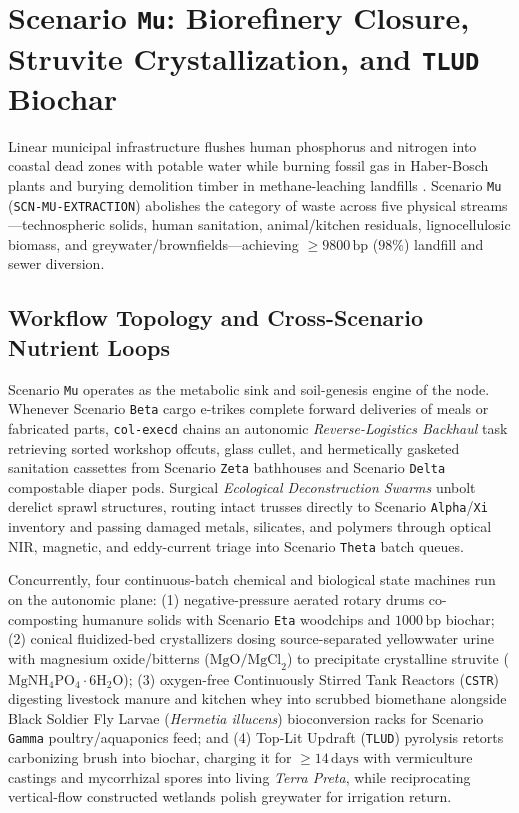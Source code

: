 \section{Scenario \texttt{Mu}: Biorefinery Closure, Struvite Crystallization, and \texttt{TLUD} Biochar}
\label{sec:scn-mu}

Linear municipal infrastructure flushes human phosphorus and nitrogen into coastal dead zones with potable water while burning fossil gas in
Haber-Bosch plants and burying demolition timber in methane-leaching landfills \parencite{rockstrom2009safe,kadlec1996}. Scenario \texttt{Mu}
(\texttt{SCN-MU-EXTRACTION}) abolishes the category of waste across five physical streams---technospheric solids, human sanitation,
animal/kitchen residuals, lignocellulosic biomass, and greywater/brownfields---achieving $\ge 9800\,\mathrm{bp}$ ($98\%$) landfill and sewer
diversion.

\subsection{Workflow Topology and Cross-Scenario Nutrient Loops}

Scenario \texttt{Mu} operates as the metabolic sink and soil-genesis engine of the node. Whenever Scenario \texttt{Beta} cargo e-trikes complete
forward deliveries of meals or fabricated parts, \texttt{col-execd} chains an autonomic \emph{Reverse-Logistics Backhaul} task retrieving sorted
workshop offcuts, glass cullet, and hermetically gasketed sanitation cassettes from Scenario \texttt{Zeta} bathhouses and Scenario \texttt{Delta}
compostable diaper pods. Surgical \emph{Ecological Deconstruction Swarms} unbolt derelict sprawl structures, routing intact trusses directly to
Scenario \texttt{Alpha}/\texttt{Xi} inventory and passing damaged metals, silicates, and polymers through optical NIR, magnetic, and eddy-current
triage into Scenario \texttt{Theta} batch queues.

Concurrently, four continuous-batch chemical and biological state machines run on the autonomic plane: (1) negative-pressure aerated rotary drums
co-composting humanure solids with Scenario \texttt{Eta} woodchips and $1000\,\mathrm{bp}$ biochar; (2) conical fluidized-bed crystallizers
dosing source-separated yellowwater urine with magnesium oxide/bitterns ($\mathrm{MgO}/\mathrm{MgCl}_2$) to precipitate crystalline struvite
($\mathrm{MgNH_4PO_4\cdot 6H_2O}$); (3) oxygen-free Continuously Stirred Tank Reactors (\texttt{CSTR}) digesting livestock manure and kitchen
whey into scrubbed biomethane alongside Black Soldier Fly Larvae (\emph{Hermetia illucens}) bioconversion racks for Scenario \texttt{Gamma}
poultry/aquaponics feed; and (4) Top-Lit Updraft (\texttt{TLUD}) pyrolysis retorts carbonizing brush into biochar, charging it for
$\ge 14\,\mathrm{days}$ with vermiculture castings and mycorrhizal spores into living \emph{Terra Preta}, while reciprocating vertical-flow
constructed wetlands \parencite{kadlec1996} polish greywater for irrigation return.

